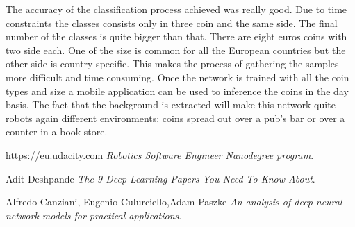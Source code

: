 \documentclass[10pt,journal,compsoc]{IEEEtran}
\begin{document}
The accuracy of the classification process achieved was really good. Due to time constraints the classes consists only in three coin and the same side. The final number of the classes is quite bigger than that. There are eight euros coins with two side each. One of the size is common for all the European countries but the other side is country specific. This makes the process of gathering the samples more difficult and time consuming. Once the network is trained with all the coin types and size a mobile application can be used to inference the coins in the day basis. The fact that the background is extracted will make this network quite robots again different environments: coins spread out over a pub's bar or over a counter in a book store.


\begin{thebibliography}{9}


https://eu.udacity.com
\textit{Robotics Software Engineer Nanodegree program}. 

Adit Deshpande
\textit{The 9 Deep Learning Papers You Need To Know About}. 

Alfredo Canziani, Eugenio Culurciello,Adam Paszke  
\textit{An analysis of deep neural network models for practical applications}. 
\end{thebibliography}
		
\end{document}
